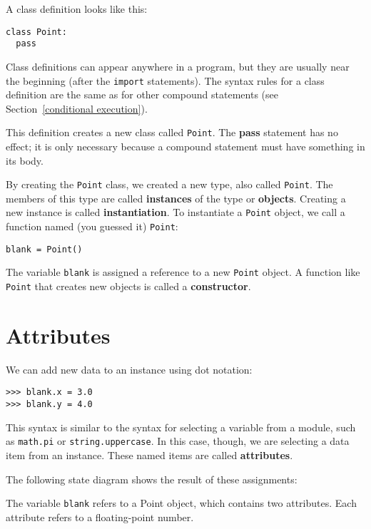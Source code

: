 A class definition looks like this:

\beforeverb
\begin{verbatim}
class Point:
  pass
\end{verbatim}
\afterverb
%
Class definitions can appear anywhere in a program, but they are
usually near the beginning (after the {\tt import} statements).  The
syntax rules for a class definition are the same as for other compound
statements (see Section~\ref{conditional execution}).

This definition creates a new class called {\tt Point}.  The
{\bf pass} statement has no effect; it is only
necessary because a compound statement must have something in its
body.

By creating the {\tt Point} class, we created a new type, also
called {\tt Point}.  The members of this type are called
{\bf instances} of the type or {\bf objects}.  Creating a new instance
is called {\bf instantiation}.  To instantiate a {\tt Point} object,
we call a function named (you guessed it) {\tt Point}:


\beforeverb
\begin{verbatim}
blank = Point()
\end{verbatim}
\afterverb
%
The variable {\tt blank} is assigned a reference to a new
{\tt Point} object.  A function like {\tt Point} that creates
new objects is called a {\bf constructor}.


\section{Attributes}

We can add new data to an instance using dot notation:

\beforeverb
\begin{verbatim}
>>> blank.x = 3.0
>>> blank.y = 4.0
\end{verbatim}
\afterverb
%
This syntax is similar to the syntax for selecting a variable from a
module, such as {\tt math.pi} or {\tt string.uppercase}.  In this case,
though, we are selecting a data item from an instance.  These
named items are called {\bf attributes}.

The following state diagram shows the result of these assignments:

\beforefig
\centerline{}
\afterfig

The variable {\tt blank} refers to a Point object, which
contains two attributes.  Each attribute refers to a
floating-point number.

